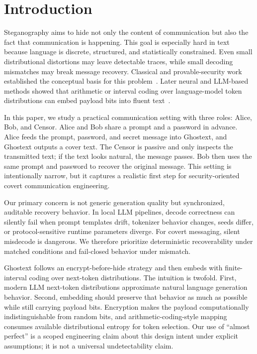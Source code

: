 \section{Introduction}
Steganography aims to hide not only the content of communication but also the fact that communication is happening. This goal is especially hard in text because language is discrete, structured, and statistically constrained. Even small distributional distortions may leave detectable traces, while small decoding mismatches may break message recovery. Classical and provable-security work established the conceptual basis for this problem~\cite{DBLP:conf/crypto/Simmons83,DBLP:journals/jsac/AndersonP98,DBLP:conf/crypto/HopperLA02}. Later neural and LLM-based methods showed that arithmetic or interval coding over language-model token distributions can embed payload bits into fluent text~\cite{DBLP:conf/acl/FangJA17,ziegler-etal-2019-neural,DBLP:conf/acl/ZhangYYH21,DBLP:conf/naacl/LinLZL24}.

In this paper, we study a practical communication setting with three roles: Alice, Bob, and Censor. Alice and Bob share a prompt and a password in advance. Alice feeds the prompt, password, and secret message into Ghostext, and Ghostext outputs a cover text. The Censor is passive and only inspects the transmitted text; if the text looks natural, the message passes. Bob then uses the same prompt and password to recover the original message. This setting is intentionally narrow, but it captures a realistic first step for security-oriented covert communication engineering.

Our primary concern is not generic generation quality but synchronized, auditable recovery behavior. In local LLM pipelines, decode correctness can silently fail when prompt templates drift, tokenizer behavior changes, seeds differ, or protocol-sensitive runtime parameters diverge. For covert messaging, silent misdecode is dangerous. We therefore prioritize deterministic recoverability under matched conditions and fail-closed behavior under mismatch.

Ghostext follows an encrypt-before-hide strategy and then embeds with finite-interval coding over next-token distributions. The intuition is twofold. First, modern LLM next-token distributions approximate natural language generation behavior. Second, embedding should preserve that behavior as much as possible while still carrying payload bits. Encryption makes the payload computationally indistinguishable from random bits, and arithmetic-coding-style mapping consumes available distributional entropy for token selection. Our use of ``almost perfect'' is a scoped engineering claim about this design intent under explicit assumptions; it is not a universal undetectability claim.

